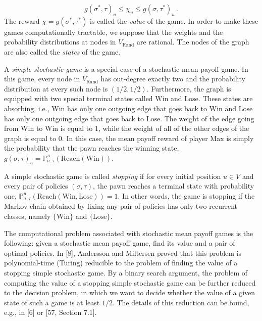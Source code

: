 \documentclass[10pt,a4paper]{article}
\theoremstyle{definition}
\begin{document}
\[
g(\sigma^{*},\tau)_{u}\leq\chi_{u}\leq g(\sigma,\tau^{*})_{u}\,.
\]
The reward $\chi=g(\sigma^{*},\tau^{*})$ is called the \emph{value} of the game. In order to make these games computationally tractable, we suppose that the weights and the probability distributions at nodes in $V_{\mathrm{Rand}}$ are rational. The nodes of the graph are also called the \emph{states} of the game.

A \emph{simple stochastic game} is a special case of a stochastic mean payoff game. In this game, every node in $V_{\mathrm{Rand}}$ has out-degree exactly two and the probability distribution at every such node is $(1/2,1/2)$. Furthermore, the graph is equipped with two special terminal states called $\mathrm{Win}$ and $\mathrm{Lose}$. These states are absorbing, i.e., $\mathrm{Win}$ has only one outgoing edge that goes back to $\mathrm{Win}$ and $\mathrm{Lose}$ has only one outgoing edge that goes back to $\mathrm{Lose}$. The weight of the edge going from $\mathrm{Win}$ to $\mathrm{Win}$ is equal to $1$, while the weight of all of the other edges of the graph is equal to $0$. In this case, the mean payoff reward of player Max is simply the probability that the pawn reaches the winning state, $g(\sigma,\tau)_{u}=\mathbb{P}^{u}_{\sigma,\tau}(\text{Reach}(\mathrm{Win}))$.

A simple stochastic game is called \emph{stopping} if for every initial position $u\in V$ and every pair of policies $(\sigma,\tau)$, the pawn reaches a terminal state with probability one, $\mathbb{P}^{u}_{\sigma,\tau}(\text{Reach}(\mathrm{Win},\mathrm{Lose}))=1$. In other words, the game is stopping if the Markov chain obtained by fixing any pair of policies has only two recurrent classes, namely $\{\mathrm{Win}\}$ and $\{\mathrm{Lose}\}$.

The computational problem associated with stochastic mean payoff games is the following: given a stochastic mean payoff game, find its value and a pair of optimal policies. In [8], Andersson and Miltersen proved that this problem is polynomial-time (Turing) reducible to the problem of finding the value of a stopping simple stochastic game. By a binary search argument, the problem of computing the value of a stopping simple stochastic game can be further reduced to the decision problem, in which we want to decide whether the value of a given state of such a game is at least $1/2$. The details of this reduction can be found, e.g., in [6] or [57, Section 7.1].
\end{document}
